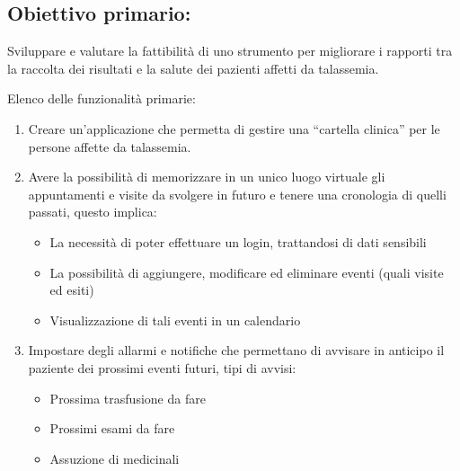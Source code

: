 \documentclass[12pt,a4paper,openright,twoside]{report}
\begin{document}
\subsection{Obiettivo primario:} 
Sviluppare e valutare la fattibilità di uno strumento per migliorare i rapporti tra la raccolta dei risultati e la salute dei pazienti affetti da talassemia. 

Elenco delle funzionalità primarie:

\begin{enumerate}
    \item Creare un'applicazione che permetta di gestire una ``cartella clinica'' per le persone affette da talassemia.
    \item Avere la possibilità di memorizzare in un unico luogo virtuale gli appuntamenti e visite da svolgere in futuro e tenere una cronologia di quelli passati, questo implica:
    \begin{itemize}
        \item La necessità di poter effettuare un login, trattandosi di dati sensibili
        \item La possibilità di aggiungere, modificare ed eliminare eventi (quali visite ed esiti)
        \item Visualizzazione di tali eventi in un calendario
    \end{itemize}
    \item Impostare degli allarmi e notifiche che permettano di avvisare in anticipo il paziente dei prossimi eventi futuri, tipi di avvisi:
    \begin{itemize}
        \item Prossima trasfusione da fare
        \item Prossimi esami da fare
        \item Assuzione di medicinali
    \end{itemize}
\end{enumerate}
\end{document}
